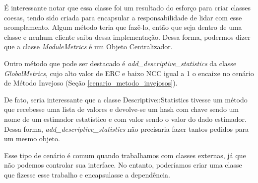 É interessante notar que essa classe foi um resultado do esforço para criar classes coesas, tendo sido
criada para encapsular a responsabilidade de lidar com esse acomplamento. Algum método teria que fazê-lo,
então que seja dentro de uma classe e nenhum cliente saiba dessa implementação. Dessa forma, podermos dizer
que a classe \textit{ModuleMetrics} é um Objeto Centralizador.

Outro método que pode ser destacado é \textit{add\_descriptive\_statistics} da classe 
\textit{GlobalMetrics}, cujo alto valor de ERC e baixo NCC igual a 1 o encaixe no cenário de Método 
Invejoso (Seção \ref{cenario_metodo_invejosos}).



De fato, seria interessante que a classe Descriptive::Statistics tivesse um método que recebesse
uma lista de valores e devolve-se um hash com chave sendo um nome de um estimador estatístico e
com valor sendo o valor do dado estimador. Dessa forma, \textit{add\_descriptive\_statistics} não 
precisaria fazer tantos pedidos para um mesmo objeto.

Esse tipo de cenário é comum quando trabalhamos com classes externas, já que não podemos controlar
sua interface. No entanto, poderíamos criar uma classe que fizesse esse trabalho e encapsulasse
a dependência.

